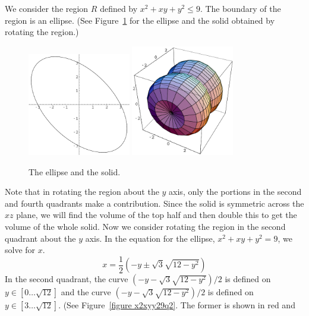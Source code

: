\begin{Solution}
  \label{solution volume R rotate y}
  We consider the region $R$ defined by $x^2 + x y + y^2 \leq 9$.  The boundary
  of the region is an ellipse.  (See Figure~\ref{figure x2xyy29} for the 
  ellipse and the solid obtained by rotating the region.)
  \begin{figure}[h!]
    \begin{center}
      \includegraphics[width=0.4\textwidth]{calculus/vector/x2xyy29}
      \includegraphics[width=0.4\textwidth]{calculus/vector/x2xyy29solid}
    \end{center}
    \caption{The ellipse and the solid.}
    \label{figure x2xyy29}
  \end{figure}
  Note that in rotating the region about the $y$ axis, only the portions in
  the second and fourth quadrants make a contribution.  Since the solid is
  symmetric across the $x z$ plane, we will find the volume of the top half
  and then double this to get the volume of the whole solid.  Now we consider
  rotating the region in the second quadrant about the $y$ axis. In the 
  equation for the ellipse, $x^2 + x y + y^2 = 9$, we solve for $x$.
  \[
  x = \frac{1}{2} \left( -y \pm \sqrt{3} \sqrt{12 - y^2} \right)
  \]
  In the second quadrant, the curve $(-y - \sqrt{3} \sqrt{12 - y^2})/2$
  is defined on $y \in [0 \ldots \sqrt{12}]$ and the curve 
  $(-y - \sqrt{3} \sqrt{12 - y^2})/2$ is defined on $y \in [3 \ldots \sqrt{12}]$.
  (See Figure~\ref{figure x2xyy29q2}.  The former is shown in red and 

\end{Solution}
